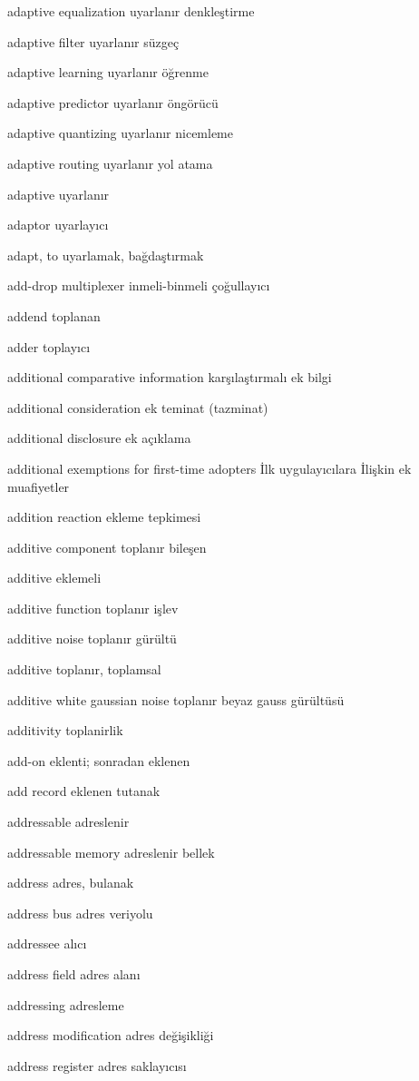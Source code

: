 \documentclass[12pt,fleqn]{article}\usepackage{../../common}
\begin{document}
adaptive equalization uyarlanır denkleştirme

adaptive filter uyarlanır süzgeç

adaptive learning uyarlanır öğrenme

adaptive predictor uyarlanır öngörücü

adaptive quantizing uyarlanır nicemleme

adaptive routing uyarlanır yol atama

adaptive uyarlanır

adaptor uyarlayıcı

adapt, to uyarlamak, bağdaştırmak

add-drop multiplexer inmeli-binmeli çoğullayıcı

addend toplanan

adder toplayıcı

additional comparative information karşılaştırmalı ek bilgi

additional consideration ek teminat (tazminat)

additional disclosure ek açıklama

additional exemptions for first-time adopters İlk uygulayıcılara İlişkin ek muafiyetler

addition reaction ekleme tepkimesi

additive component toplanır bileşen

additive eklemeli

additive function toplanır işlev

additive noise toplanır gürültü

additive toplanır, toplamsal

additive white gaussian noise toplanır beyaz gauss gürültüsü

additivity toplanirlik

add-on eklenti; sonradan eklenen

add record eklenen tutanak

addressable adreslenir

addressable memory adreslenir bellek

address adres, bulanak

address bus adres veriyolu

addressee alıcı

address field adres alanı

addressing adresleme

address modification adres değişikliği

address register adres saklayıcısı
\end{document}
